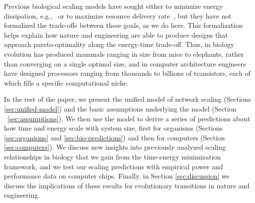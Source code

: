 \documentclass[12pt]{article}
\begin{document}
Previous biological scaling models have sought either to minimize energy dissipation, e.g.,~\cite{west97} or to maximize resource delivery rate~\cite{banavar10}, but they have
not formalized the trade-offs between these goals, as we do here.  This formalization
helps explain how nature and engineering are able to produce designs that
approach pareto-optimality along the energy-time trade-off.  Thus, in biology
evolution has produced mammals ranging in size from mice to elephants, rather
than converging on a single optimal size, and in computer architecture
engineers have designed processors ranging from thousands to
billions of transistors, each of which fills a specific computational niche.

In the rest of the paper, we present the unified model of network scaling
(Sections \ref{sec:unified-model}) and the basic assumptions underlying the
model (Section ~\ref{sec:assumptions}).  We then use the model to derive a
series of predictions about how time and energy scale with system size, first
for organisms (Sections \ref{sec:organisms} and \ref{sec:bio-predictions}) and then for computers (Section
\ref{sec:computers}). We discuss new insights into previously analyzed
scaling relationships in biology that we gain from the time-energy minimization
framework, and we test our scaling predictions with empirical power and performance
data on computer chips.  Finally, in Section \ref{sec:discussion}  we discuss
the implications of these results for evolutionary transitions in nature and
engineering.
\end{document}
